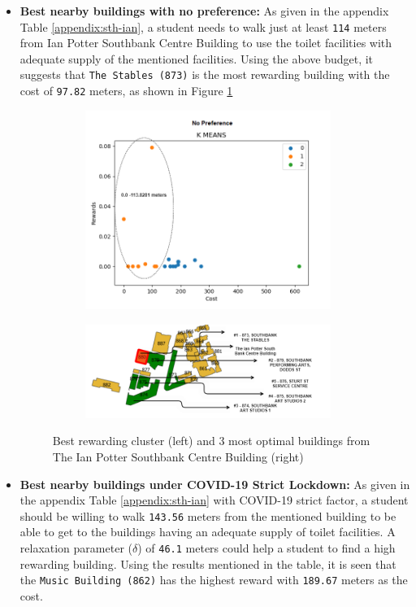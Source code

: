 \begin{itemize}
    \item \textbf{Best nearby buildings with no preference:}
    As given in the appendix Table \ref{appendix:sth-ian}, a student needs to walk just at least \texttt{114} meters from  Ian Potter Southbank Centre Building to use the toilet facilities with adequate supply of the mentioned facilities. Using the above budget, it suggests that \texttt{The Stables (873)} is the most rewarding building with the cost of \texttt{97.82} meters, as shown in Figure \ref{fig:i}
    
     \begin{figure}[H]
\begin{subfigure}{.5\textwidth}
\centering
  \includegraphics[width=8cm]{resources/images/spatial-tr/880plot.png}
\end{subfigure}%
\begin{subfigure}{.5\textwidth}
  \centering
  \includegraphics[width=8cm]{resources/images/spatial-tr/ian1.PNG}
\end{subfigure}
\caption{Best rewarding cluster (left) and 3 most optimal buildings from The Ian Potter Southbank Centre Building (right)}
\label{fig:i}
\end{figure}
    
\item \textbf{Best nearby buildings under COVID-19 Strict Lockdown:} As given in the appendix Table \ref{appendix:sth-ian} with COVID-19 strict factor, a student should be willing to walk \texttt{143.56} meters from the mentioned building to be able to get to the buildings having an adequate supply of toilet facilities. A relaxation parameter ($\delta$) of \texttt{46.1} meters could help a student to find a high rewarding building. Using the results mentioned in the table, it is seen that the \texttt{Music Building (862)} has the highest reward with \texttt{189.67} meters as the cost.


\end{itemize}

